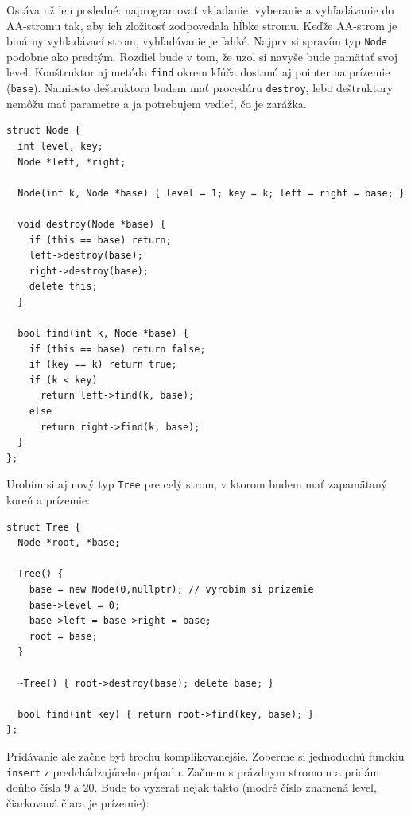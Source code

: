 \documentclass[10pt]{article}
\def\prg{\lstinline}
\def\ods{\vspace*{10pt}}
\begin{document}
{\ods
Ostáva už len posledné: naprogramovať vkladanie, vyberanie a vyhľadávanie do AA-stromu tak,
aby ich zložitosť zodpovedala hĺbke stromu. Keďže AA-strom je binárny vyhľadávací strom,
vyhľadávanie je ľahké. Najprv si spravím typ \prg!Node! podobne ako predtým. Rozdiel
bude v tom, že uzol si navyše bude pamätať svoj level. Konštruktor aj metóda
\prg!find! okrem kľúča dostanú aj pointer na prízemie (\prg!base!).
Namiesto deštruktora budem mať procedúru \prg!destroy!, lebo deštruktory nemôžu
mať parametre a ja potrebujem vedieť, čo je zarážka.

\ods
\begin{lstlisting}
struct Node {
  int level, key;
  Node *left, *right;

  Node(int k, Node *base) { level = 1; key = k; left = right = base; }

  void destroy(Node *base) {
    if (this == base) return;
    left->destroy(base);
    right->destroy(base);
    delete this;
  }

  bool find(int k, Node *base) {
    if (this == base) return false;
    if (key == k) return true;
    if (k < key)
      return left->find(k, base);
    else
      return right->find(k, base);
  }
};
\end{lstlisting}

Urobím si aj nový typ \prg!Tree! pre celý strom, v ktorom budem mať zapamätaný koreň
a prízemie:

\ods
\begin{lstlisting}
struct Tree {
  Node *root, *base;

  Tree() {
    base = new Node(0,nullptr); // vyrobim si prizemie
    base->level = 0;
    base->left = base->right = base;
    root = base; 
  }

  ~Tree() { root->destroy(base); delete base; }

  bool find(int key) { return root->find(key, base); }
};
\end{lstlisting}

\ods
Pridávanie ale začne byť trochu komplikovanejšie. Zoberme si jednoduchú funckiu {\tt insert}
z predchádzajúceho prípadu. Začnem s prázdnym stromom a pridám doňho čísla $9$ a $20$. Bude to vyzerať nejak takto (modré číslo znamená level, čiarkovaná čiara je prízemie):

}
\end{document}
